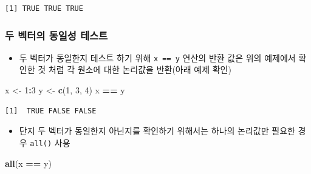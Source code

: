 \documentclass[
  11pt,
]{krantz}
\newenvironment{Shaded}{\begin{snugshade}}{\end{snugshade}}
\newcommand{\DecValTok}[1]{\textcolor[rgb]{0.06,0.06,0.06}{#1}}
\newcommand{\KeywordTok}[1]{\textcolor[rgb]{0.27,0.27,0.27}{\textbf{#1}}}
\newcommand{\NormalTok}[1]{#1}
\newcommand{\OperatorTok}[1]{\textcolor[rgb]{0.43,0.43,0.43}{\textbf{#1}}}
\newcommand{\StringTok}[1]{\textcolor[rgb]{0.5,0.5,0.5}{#1}}
\providecommand{\tightlist}{%
  \setlength{\itemsep}{0pt}\setlength{\parskip}{0pt}}
\begin{document}
\begin{Shaded}
\end{Shaded}

\begin{verbatim}
[1] TRUE TRUE TRUE
\end{verbatim}

\normalsize

\hypertarget{vec-identical}{%
\subsubsection*{\texorpdfstring{\textbf{두 벡터의 동일성 테스트}}{두 벡터의 동일성 테스트}}\label{vec-identical}}


\begin{itemize}
\tightlist
\item
  두 벡터가 동일한지 테스트 하기 위해 \texttt{x\ ==\ y} 연산의 반환 값은 위의 예제에서 확인한 것 처럼 각 원소에 대한 논리값을 반환(아래 예제 확인)
\end{itemize}

\footnotesize

\begin{Shaded}
\begin{Highlighting}[]
\NormalTok{x <-}\StringTok{ }\DecValTok{1}\OperatorTok{:}\DecValTok{3}
\NormalTok{y <-}\StringTok{ }\KeywordTok{c}\NormalTok{(}\DecValTok{1}\NormalTok{, }\DecValTok{3}\NormalTok{, }\DecValTok{4}\NormalTok{)}
\NormalTok{x }\OperatorTok{==}\StringTok{ }\NormalTok{y}
\end{Highlighting}
\end{Shaded}

\begin{verbatim}
[1]  TRUE FALSE FALSE
\end{verbatim}

\normalsize

\begin{itemize}
\tightlist
\item
  단지 두 벡터가 동일한지 아닌지를 확인하기 위해서는 하나의 논리값만 필요한 경우 \texttt{all()} 사용
\end{itemize}

\footnotesize

\begin{Shaded}
\begin{Highlighting}[]
\KeywordTok{all}\NormalTok{(x }\OperatorTok{==}\StringTok{ }\NormalTok{y)}
\end{Highlighting}
\end{Shaded}
\end{document}
